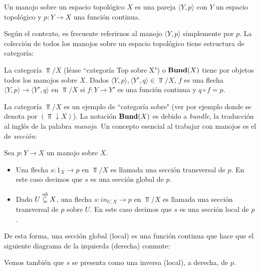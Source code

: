 \begin{Def}[Manojo]
    Un manojo sobre un espacio topológico $X$ es una pareja $\langle Y, p\rangle$ con $Y$ un espacio topológico y $p:Y\to X$ una función continua.
\end{Def}
Según el contexto, es frecuente referirnos al manojo $\langle Y,p\rangle$ simplemente por $p$. La colección de todos los manojos sobre un espacio topológico tiene estructura de categoría:
\begin{Def}
   La categoría $\Top /X$ (léase ``categoría Top sobre X") o $\normalfont{\textbf{Bund}} (X)$ tiene por objetos todos los manojos sobre $X$. Dados $\langle Y,p\rangle,\langle Y',q\rangle\in \Top/X$, $f$ es una flecha $\langle Y,p\rangle\to\langle Y',q\rangle$ en $\Top/X$ si $f:Y\to Y'$ es una función continua y $q\circ f=p$.
   
\end{Def}
La categoría $\Top /X$ es un ejemplo de ``categoría sobre" (ver por ejemplo \cite[p.~45]{CWM} donde se denota por $(\Top\downarrow X)$). La notación $\normalfont{\textbf{Bund}} (X)$ es debido a \textit{bundle}, la traducción al inglés de la palabra \textit{manojo}. Un concepto esencial al trabajar con manojos es el de \textit{sección}:
\begin{Def}[Secciones]
   Sea $p:Y\to X$ un manojo sobre $X$.
   \begin{itemize}
      \item Una flecha $s:1_{X}\to p$ en $\Top/X$ es llamada una sección transversal de $p$. En este caso decimos que $s$ es una sección global de $p$.
      \item Dado $U\stackrel{ab}{\subseteq} X$, una flecha $s:in_{U,X}\to p$ en $\Top/X$ es llamada una sección transversal de $p$ sobre $U$. En este caso decimos que $s$ es una sección local de $p$.
   \end{itemize}
\end{Def}
De esta forma, una sección global (local) es una función continua que hace que el siguiente diagrama de la izquierda (derecha) conmute:

Vemos también que $s$ se presenta como una inversa (local), a derecha, de $p$.
